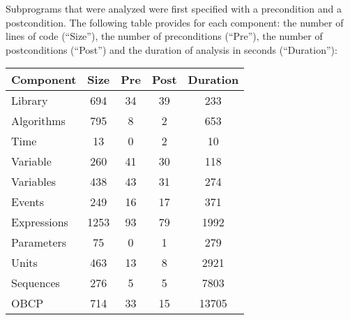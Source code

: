 \documentclass[10pt,a4paper,twocolumn]{article}
\begin{document}



Subprograms that were analyzed were first specified with a precondition and a
postcondition. The following table provides for each
component: the number of lines of code (``Size''), the number of preconditions
(``Pre''), the number of postconditions (``Post'') and the duration of analysis
in seconds (``Duration''):

\vspace{5mm}

\begin{tabular}{|l|c|c|c|c|}
\hline
{\bf Component}   & {\bf Size} & {\bf Pre} & {\bf Post} & {\bf Duration} \\
\hline
Library     &  694 &  34 &   39 &   233 \\
\hline
Algorithms  &  795 &   8 &    2 &   653 \\
\hline
Time        &   13 &   0 &    2 &    10 \\
\hline
Variable    &  260 &  41 &   30 &   118 \\
\hline
Variables   &  438 &  43 &   31 &   274 \\
\hline
Events      &  249 &  16 &   17 &   371 \\
\hline
Expressions & 1253 &  93 &   79 &  1992 \\
\hline
Parameters  &   75 &   0 &    1 &   279 \\
\hline
Units       &  463 &  13 &    8 &  2921 \\
\hline
Sequences   &  276 &   5 &    5 &  7803 \\
\hline
OBCP        &  714 &  33 &   15 & 13705 \\
\hline
\end{tabular}
\end{document}

